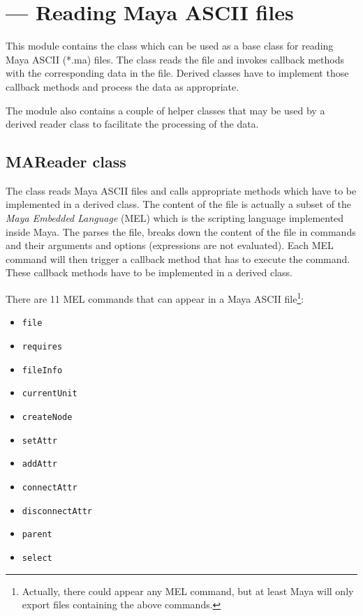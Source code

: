 \section{ ---
        Reading Maya ASCII files}


This module contains the  class which can be used as a
base class for reading Maya ASCII (*.ma) files. The class reads the file
and invokes callback methods with the corresponding data in the
file. Derived classes have to implement those callback methods and
process the data as appropriate.

The module also contains a couple of helper classes that may be
used by a derived reader class to facilitate the processing of the
data.

\subsection{MAReader class}

The  class reads Maya ASCII files and calls
appropriate methods which have to be implemented in a derived class.
The content of the file is actually a subset of the {\em Maya Embedded
Language} (MEL) which is the scripting language implemented inside
Maya.  The  parses the file, breaks down the content
of the file in commands and their arguments and options (expressions
are not evaluated). Each MEL command will then trigger a callback
method that has to execute the command.  These callback methods have
to be implemented in a derived class.

There are 11 MEL commands that can appear in a Maya ASCII 
file\footnote{Actually, there could appear any MEL command, but at least
Maya will only export files containing the above commands.}:

\begin{itemize}
\item {\tt file}
\item {\tt requires}
\item {\tt fileInfo}
\item {\tt currentUnit}
\item {\tt createNode}
\item {\tt setAttr}
\item {\tt addAttr}
\item {\tt connectAttr}
\item {\tt disconnectAttr}
\item {\tt parent}
\item {\tt select}
\end{itemize}

